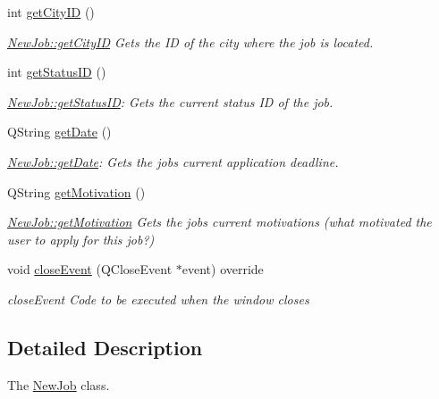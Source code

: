 \begin{DoxyCompactItemize}
int \mbox{\hyperlink{class_new_job_aed4a9a6fa7eab69062c1d36afd58cd75}{get\+City\+ID}} ()
\begin{DoxyCompactList}\small\item\em \mbox{\hyperlink{class_new_job_aed4a9a6fa7eab69062c1d36afd58cd75}{New\+Job\+::get\+City\+ID}} Gets the ID of the city where the job is located. \end{DoxyCompactList}\item 
int \mbox{\hyperlink{class_new_job_aebbe015a22f5dbf60a34c33dd5c5a8e7}{get\+Status\+ID}} ()
\begin{DoxyCompactList}\small\item\em \mbox{\hyperlink{class_new_job_aebbe015a22f5dbf60a34c33dd5c5a8e7}{New\+Job\+::get\+Status\+ID}}\+: Gets the current status ID of the job. \end{DoxyCompactList}\item 
Q\+String \mbox{\hyperlink{class_new_job_abe92b6bce4e8e3485f59554a2cbad1bc}{get\+Date}} ()
\begin{DoxyCompactList}\small\item\em \mbox{\hyperlink{class_new_job_abe92b6bce4e8e3485f59554a2cbad1bc}{New\+Job\+::get\+Date}}\+: Gets the job\textquotesingle{}s current application deadline. \end{DoxyCompactList}\item 
Q\+String \mbox{\hyperlink{class_new_job_a665113a114684439ed3705c8c5f8eabf}{get\+Motivation}} ()
\begin{DoxyCompactList}\small\item\em \mbox{\hyperlink{class_new_job_a665113a114684439ed3705c8c5f8eabf}{New\+Job\+::get\+Motivation}} Gets the job\textquotesingle{}s current motivations (what motivated the user to apply for this job?) \end{DoxyCompactList}\item 
void \mbox{\hyperlink{class_new_job_a84f6390f63ce01fb860b375f53f9c68d}{close\+Event}} (Q\+Close\+Event $\ast$event) override
\begin{DoxyCompactList}\small\item\em close\+Event Code to be executed when the window closes \end{DoxyCompactList}\end{DoxyCompactItemize}


\subsection{Detailed Description}
The \mbox{\hyperlink{class_new_job}{New\+Job}} class. 

